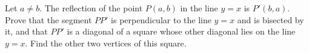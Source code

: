 Let $a\ne b$. The reflection of the point $P(a,b)$ in the line $y=x$ is $P'(b,a)$. Prove that the segment $PP'$ is perpendicular to the line $y=x$ and is bisected by it, and that $PP'$ is a diagonal of a square whose other diagonal lies on the line $y=x$. Find the other two vertices of this square.
